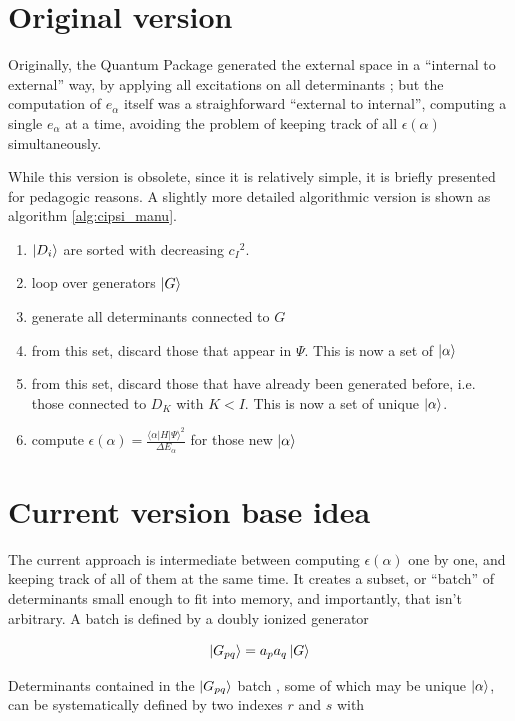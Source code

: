 \documentclass[./thesis.tex]{subfiles}
\begin{document}
\section{Original version}

Originally, the Quantum Package generated the external space in a ``internal to external'' way, by applying all excitations on all determinants ; but the computation of $e_\alpha$ itself was a straighforward ``external to internal'', computing a single $e_\alpha$ at a time, avoiding the problem of keeping track of all $\epsilon(\alpha)$ simultaneously.

While this version is obsolete, since it is relatively simple, it is briefly presented for pedagogic reasons. A slightly more detailed algorithmic version is shown as algorithm \ref{alg:cipsi_manu}.

\begin{enumerate}
\item
$\ket {D_i}$ are sorted with decreasing ${c_I}^2$.
\item
loop over generators $\ket G$
\item
generate all determinants connected to $G$
\item
from this set, discard those that appear in $\Psi$. This is now a set of $\ket \alpha$
\item
from this set, discard those that have already been generated before, i.e. those connected to $D_K$ with $K<I$. This is now a set of unique $\ket \alpha$.
\item
compute $\epsilon(\alpha) = \frac{\langle \alpha|H|\Psi\rangle^2}{\Delta E_\alpha}$ for those new $\ket \alpha$
\end{enumerate}


\section{Current version base idea}

The current approach is intermediate between computing $\epsilon(\alpha)$ one by one, and keeping track of all of them at the same time.
It creates a subset, or ``batch'' of determinants small enough to fit into memory, and importantly, that isn't arbitrary.
A batch is defined by a doubly ionized generator


\begin{equation}
\ket {G_{pq}} = a_p a_q \ket G
\end{equation}



Determinants contained in the $\ket {G_{pq}}$ batch , some of which may be unique ${\ket{\alpha}}$, can be systematically defined by two indexes $r$ and $s$ with
\end{document}
